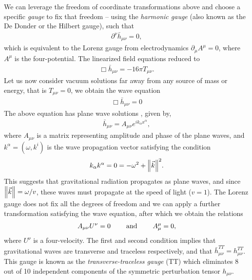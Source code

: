 We can leverage the freedom of coordinate transformations above and choose a specific \textit{gauge} to fix that freedom --  using the \textit{harmonic gauge} (also known as the De Donder or the Hilbert gauge), such that
\begin{align}
    \partial^{\nu}\bar{h}_{\mu\nu} = 0,
\end{align}
which is equivalent to the Lorenz gauge from electrodynamics $\partial_{\mu}A^{\mu} = 0$, where $A^{\mu}$ is the four-potential. The linearized field equations reduced to 
\begin{align}
    \Box\bar{h}_{\mu\nu} = -16\pi T_{\mu\nu}.
\end{align}
Let us now consider vacuum solutions far away from any source of mass or energy, that is $T_{\mu\nu} = 0$, we obtain the wave equation 
\begin{align}
    \Box \bar{h}_{\mu\nu} = 0
\end{align}
The above equation has plane wave solutions \cite{Maggiore:2008aaa}, given by, 
\begin{align}
    \bar{h}_{\mu\nu} = A_{\mu\nu}e^{ik_{\alpha}x^{\alpha}},
\end{align}
where $A_{\mu\nu}$ is a matrix representing amplitude and phase of the plane waves, and $k^{\alpha} = (\omega, k^i)$ is the wave propagation vector satisfying the condition
\begin{align}
    k_{\alpha}k^{\alpha} = 0 = -\omega^2 + \norm{\vec{k}}^2.
\end{align}
This suggests that gravitational radiation propagates as plane waves, and since $\norm{\vec{k}} = \omega/v$, these waves must propagate at the speed of light ($v=1$). The Lorenz gauge does not fix all the degrees of freedom and we can apply a further transformation satisfying the wave equation, after which we obtain the relations
\begin{align}
    A_{\mu\nu}U^{\nu} = 0 \hspace{0.8cm} \text{and} \hspace{0.8cm} A^{\mu}_{ \mu} = 0,
\end{align}
where $U^{\nu}$ is a four-velocity. The first and second condition implies that gravitational waves are transverse and traceless respectively, and that $\bar{h}_{\mu\nu}^{TT} = h_{\mu\nu}^{TT}$. This gauge is known as the \textit{transverse-traceless gauge} (TT) which eliminates 8 out of 10 independent components of the symmetric perturbation tensor $h_{\mu\nu}$.

